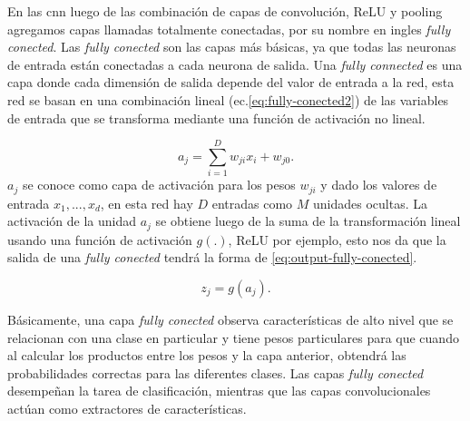 En las \ac{cnn} luego de las combinación de capas de convolución, ReLU y pooling agregamos capas llamadas totalmente conectadas, por su nombre en ingles \textit{fully conected}.
Las \textit{fully conected} son las capas más básicas, ya que todas las neuronas de entrada están conectadas a cada neurona de salida. Una \textit{fully connected }  es una capa donde cada dimensión de salida  depende del valor de entrada a la red, esta red se basan en una combinación lineal (ec.\eqref{eq:fully-conected2}) de las variables de entrada que se transforma mediante una función de activación no lineal.


\begin{equation}\label{eq:fully-conected2}
a_j = \sum_{i=1}^D w_{ji}  x_i + w_{j0}.
\end{equation}
$ a_j$  se conoce como capa de activación para los pesos $w_{ji}$ y dado los valores de entrada ${x_1,...,x_d}$, en esta red hay  $ D$ entradas como $M$ unidades ocultas. La activación de la unidad  $ a_j$ se obtiene luego de la suma de la transformación lineal usando una función de activación $ g(.)$, ReLU por ejemplo, esto nos da que la salida de una \textit{fully conected} tendrá la forma de  \eqref{eq:output-fully-conected}.

\begin{equation}\label{eq:output-fully-conected}
z_j = g(a_j).
\end{equation}

Básicamente, una capa \textit{fully conected} observa características de alto nivel que se relacionan con una clase en particular y tiene pesos particulares para que cuando al calcular los productos entre los pesos y la capa anterior, obtendrá las probabilidades correctas para las diferentes clases. Las capas \textit{fully conected }desempeñan  la tarea de clasificación, mientras que las capas convolucionales actúan como extractores de características.





